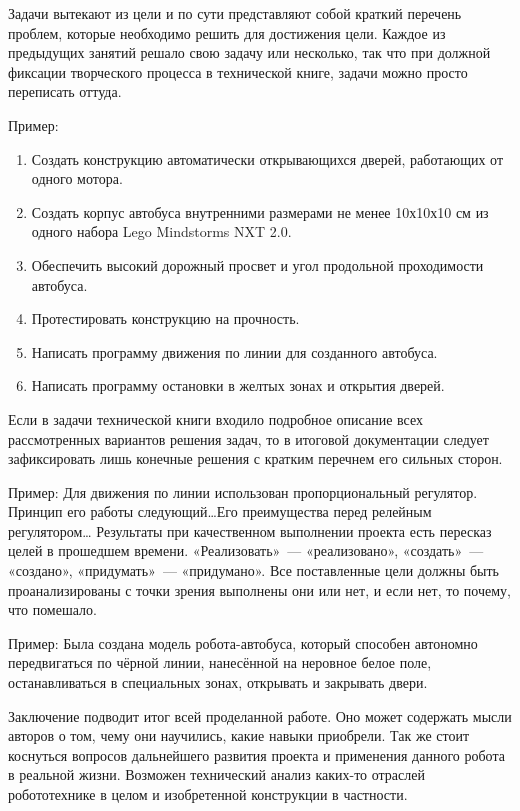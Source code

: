 Задачи вытекают из цели и по сути представляют собой краткий перечень проблем, которые необходимо решить для достижения цели. Каждое из предыдущих занятий решало свою задачу или несколько, так что при должной фиксации творческого процесса в технической книге, задачи можно просто переписать оттуда.

Пример:

\begin{enumerate}
	\item Создать конструкцию автоматически открывающихся дверей, работающих от одного мотора.
	\item Создать корпус автобуса внутренними размерами не менее 10х10х10 см из одного набора Lego Mindstorms NXT 2.0.
	\item Обеспечить высокий дорожный просвет и угол продольной проходимости автобуса.
	\item Протестировать конструкцию на прочность. 
	\item Написать программу движения по линии для созданного автобуса. 
	\item Написать программу остановки в желтых зонах и открытия дверей.
\end{enumerate}

Если в задачи технической книги входило подробное описание всех рассмотренных вариантов решения задач, то в итоговой документации следует зафиксировать лишь конечные решения с кратким перечнем его сильных сторон.

Пример: Для движения по линии использован пропорциональный регулятор. Принцип его работы следующий\dots Его преимущества перед релейным регулятором\dots
Результаты при качественном выполнении проекта есть пересказ целей в прошедшем времени. «Реализовать»~--- «реализовано», «создать»~--- «создано», «придумать»~--- «придумано». Все поставленные цели должны быть проанализированы с точки зрения выполнены они или нет, и если нет, то почему, что помешало.

Пример: Была создана модель робота-автобуса, который способен  автономно передвигаться по чёрной линии, нанесённой на неровное белое поле, останавливаться в специальных зонах, открывать и закрывать двери. 

Заключение подводит итог всей проделанной работе. Оно может содержать мысли авторов о том, чему они научились, какие навыки приобрели. Так же стоит коснуться вопросов дальнейшего развития проекта и применения  данного робота в реальной жизни. Возможен технический анализ каких-то отраслей робототехнике в целом и изобретенной конструкции в частности.

